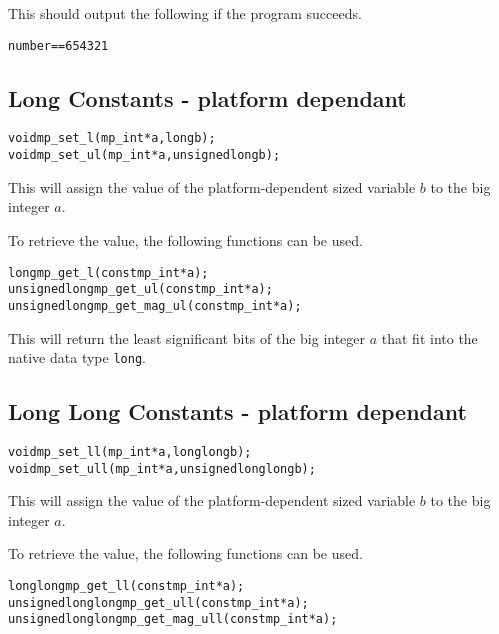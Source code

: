 \documentclass[synpaper]{book}
\begin{document}
This should output the following if the program succeeds.

\begin{alltt}
number == 654321
\end{alltt}

\subsection{Long Constants - platform dependant}

 
\begin{alltt}
void mp_set_l (mp_int *a, long b);
void mp_set_ul (mp_int *a, unsigned long b);
\end{alltt}

This will assign the value of the platform-dependent sized variable $b$ to the big integer $a$.

To retrieve the value, the following functions can be used.

  
\begin{alltt}
long mp_get_l (const mp_int *a);
unsigned long mp_get_ul (const mp_int *a);
unsigned long mp_get_mag_ul (const mp_int *a);
\end{alltt}

This will return the least significant bits of the big integer $a$ that fit into the native data type \texttt{long}.

\subsection{Long Long Constants - platform dependant}

 
\begin{alltt}
void mp_set_ll (mp_int *a, long long b);
void mp_set_ull (mp_int *a, unsigned long long b);
\end{alltt}

This will assign the value of the platform-dependent sized variable $b$ to the big integer $a$.

To retrieve the value, the following functions can be used.

\begin{alltt}
long long mp_get_ll (const mp_int *a);
unsigned long long mp_get_ull (const mp_int *a);
unsigned long long mp_get_mag_ull (const mp_int *a);
\end{alltt}
\end{document}
